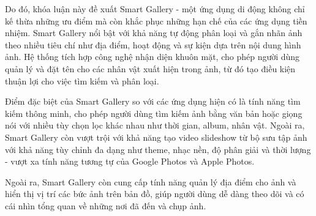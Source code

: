 Do đó, khóa luận này đề xuất Smart Gallery - một ứng dụng di động không chỉ kế thừa những ưu điểm mà còn khắc phục những hạn chế của các ứng dụng tiền nhiệm. Smart Gallery nổi bật với khả năng tự động phân loại và gắn nhãn ảnh theo nhiều tiêu chí như địa điểm, hoạt động và sự kiện dựa trên nội dung hình ảnh. Hệ thống tích hợp công nghệ nhận diện khuôn mặt, cho phép người dùng quản lý và đặt tên cho các nhân vật xuất hiện trong ảnh, từ đó tạo điều kiện thuận lợi cho việc tìm kiếm và phân loại.

Điểm đặc biệt của Smart Gallery so với các ứng dụng hiện có là tính năng tìm kiếm thông minh, cho phép người dùng tìm kiếm ảnh bằng văn bản hoặc giọng nói với nhiều tùy chọn lọc khác nhau như thời gian, album, nhân vật. Ngoài ra, Smart Gallery còn vượt trội với khả năng tạo video slideshow từ bộ sưu tập ảnh với khả năng tùy chỉnh đa dạng như theme, nhạc nền, độ phân giải và thời lượng - vượt xa tính năng tương tự của Google Photos và Apple Photos.

Ngoài ra, Smart Gallery còn cung cấp tính năng quản lý địa điểm cho ảnh và hiển thị vị trí các bức ảnh trên bản đồ, giúp người dùng dễ dàng theo dõi và có cái nhìn tổng quan về những nơi đã đến và chụp ảnh.